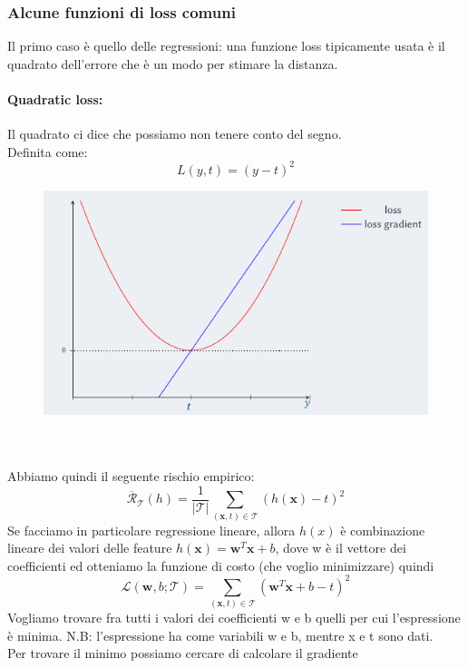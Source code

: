 \documentclass[12pt, oneside]{extbook}
\begin{document}
\subsubsection{Alcune funzioni di loss comuni}
Il primo caso è quello delle regressioni: una funzione loss tipicamente usata è il quadrato dell'errore che è un modo per stimare la distanza.\\
\paragraph{Quadratic loss:} Il quadrato ci dice che possiamo non tenere conto del segno.\\Definita come:
\begin{equation}
	L(y,t) = (y-t)^2
\end{equation}
\begin{figure}
	\includegraphics[scale=0.5]{immagini/quad_loss.png}
\end{figure}\\\\
Abbiamo quindi il seguente rischio empirico:
\begin{equation}
	\overline{\mathscr{R}}_{\mathscr{T}}(h) = \frac{1}{|\mathscr{T}|} \sum\limits_{(\textbf{x},t) \in \mathscr{T}} (h(\textbf{x})-t)^2
\end{equation}
Se facciamo in particolare regressione lineare, allora $h(x)$ è combinazione lineare dei valori delle feature $h(\textbf{x}) = \textbf{w}^T \textbf{x} + b$, dove w è il vettore dei coefficienti ed otteniamo la funzione di costo (che voglio minimizzare) quindi
\begin{equation}
	\mathscr{L}(\textbf{w}, b; \mathscr{T}) = \sum\limits_{(\textbf{x},t) \in \mathscr{T}} (\textbf{w}^T \textbf{x} +b -t)^2
\end{equation}
Vogliamo trovare fra tutti i valori dei coefficienti w e b quelli per cui l'espressione è minima. N.B: l'espressione ha come variabili w e b, mentre x e t sono dati.\\Per trovare il minimo possiamo cercare di calcolare il gradiente
\end{document}
